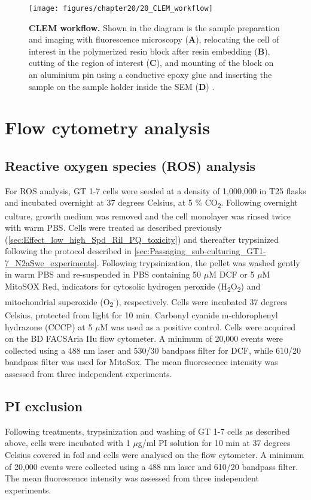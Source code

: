 \begin{figure}[!htbp]
  \texttt{[image: figures/chapter20/20\_CLEM\_workflow]}
  \caption[CLEM workflow]{\textbf{CLEM workflow.} Shown in the diagram is the sample preparation and imaging with fluorescence microscopy (\textbf{A}), relocating the cell of interest in the polymerized resin block after resin embedding (\textbf{B}), cutting of the region of interest (\textbf{C}), and mounting of the block on an aluminium pin using a conductive epoxy glue and inserting the sample on the sample holder inside the SEM (\textbf{D}) \citep{Russell2017}.}
  \label{fig:20_CLEM_workflow}
\end{figure}


\section{Flow cytometry analysis}
\subsection{Reactive oxygen species (ROS) analysis}
For ROS analysis, GT 1-7 cells were seeded at a density of 1,000,000 in T25 flasks and incubated overnight at 37 degrees Celsius, at 5 \% CO\textsubscript{2}. Following overnight culture, growth medium was removed and the cell monolayer was rinsed twice with warm PBS. Cells were treated as described previously (\cref{sec:Effect_low_high_Spd_Ril_PQ_toxicity}) and thereafter trypsinized following the protocol described in \cref{sec:Passaging_sub-culturing_GT1-7_N2aSwe_experiments}. Following trypsinization, the pellet was washed gently in warm PBS and re-suspended in PBS containing 50 $\mu$M DCF or 5 $\mu$M MitoSOX Red, indicators for cytosolic hydrogen peroxide (H\textsubscript{2}O\textsubscript{2}) and mitochondrial superoxide (O\textsubscript{2}\textsuperscript{-}), respectively. Cells were incubated 37 degrees Celsius, protected from light for 10 min. Carbonyl cyanide m-chlorophenyl hydrazone (CCCP) at 5 $\mu$M was used as a positive control. Cells were acquired on the BD FACSAria IIu flow cytometer. A minimum of 20,000 events were collected using a 488 nm laser and 530/30 bandpass filter for DCF, while 610/20 bandpass filter was used for MitoSox. The mean fluorescence intensity was assessed from three independent experiments. 


\subsection{PI exclusion}
Following treatments, trypsinization and washing of GT 1-7 cells as described above, cells were incubated with 1 $\mu$g/ml PI solution for 10 min at 37 degrees Celsius covered in foil and cells were analysed on the flow cytometer. A minimum of 20,000 events were collected using a 488 nm laser and 610/20 bandpass filter. The mean fluorescence intensity was assessed from three independent experiments. 

